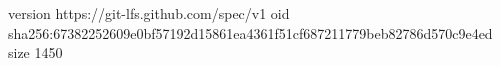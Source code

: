 version https://git-lfs.github.com/spec/v1
oid sha256:67382252609e0bf57192d15861ea4361f51cf687211779beb82786d570c9e4ed
size 1450
